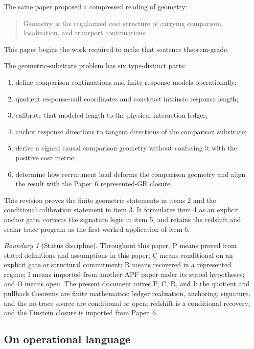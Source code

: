 \documentclass[11pt]{article}
\theoremstyle{remark}
\newtheorem{warning}[theorem]{Boundary}
\newcommand{\Status}[1]{\textsf{#1}}
\begin{document}
The same paper proposed a compressed reading of geometry:
\begin{quote}
Geometry is the regularized cost structure of carrying comparison, localization, and transport continuations.
\end{quote}
This paper begins the work required to make that sentence theorem-grade.

The geometric-substrate problem has six type-distinct parts:
\begin{enumerate}
\item define comparison continuations and finite response models operationally;
\item quotient response-null coordinates and construct intrinsic response length;
\item calibrate that modeled length to the physical interaction ledger;
\item anchor response directions to tangent directions of the comparison substrate;
\item derive a signed causal comparison geometry without confusing it with the positive cost metric;
\item determine how recruitment load deforms the comparison geometry and align the result with the Paper~6 represented-GR closure.
\end{enumerate}

This revision proves the finite geometric statements in items 2 and the conditional calibration statement in item 3.  It formulates item 4 as an explicit anchor gate, corrects the signature logic in item 5, and retains the redshift and scalar trace program as the first worked application of item 6.

\begin{warning}[Status discipline]
Throughout this paper, \Status{P} means proved from stated definitions and assumptions in this paper; \Status{C} means conditional on an explicit gate or structural commitment; \Status{R} means recovered in a represented regime; \Status{I} means imported from another APF paper under its stated hypotheses; and \Status{O} means open.  The present document mixes \Status{P}, \Status{C}, \Status{R}, and \Status{I}: the quotient and pullback theorems are finite mathematics; ledger realization, anchoring, signature, and the no-trace source are conditional or open; redshift is a conditional recovery; and the Einstein closure is imported from Paper~6.
\end{warning}

\subsection*{On operational language}
\end{document}
